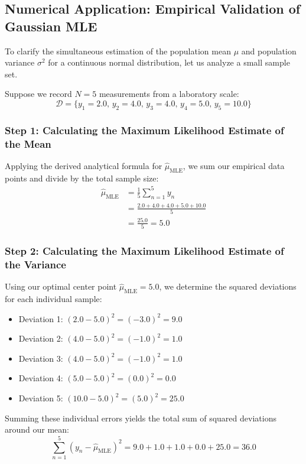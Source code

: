 \documentclass{article}
\begin{document}
\subsection{Numerical Application: Empirical Validation of Gaussian MLE}

To clarify the simultaneous estimation of the population mean $\mu$ and population variance $\sigma^2$ for a continuous normal distribution, let us analyze a small sample set. 

Suppose we record $N = 5$ measurements from a laboratory scale:
\begin{equation}
\mathcal{D} = \{y_1 = 2.0, \, y_2 = 4.0, \, y_3 = 4.0, \, y_4 = 5.0, \, y_5 = 10.0\}
\end{equation}

\subsubsection{Step 1: Calculating the Maximum Likelihood Estimate of the Mean}
Applying the derived analytical formula for $\hat{\mu}_{\text{MLE}}$, we sum our empirical data points and divide by the total sample size:
\begin{align*}
\hat{\mu}_{\text{MLE}} &= \frac{1}{5} \sum_{n=1}^{5} y_n \\
&= \frac{2.0 + 4.0 + 4.0 + 5.0 + 10.0}{5} \\
&= \frac{25.0}{5} = \mathbf{5.0}
\end{align*}

\subsubsection{Step 2: Calculating the Maximum Likelihood Estimate of the Variance}
Using our optimal center point $\hat{\mu}_{\text{MLE}} = 5.0$, we determine the squared deviations for each individual sample:
\begin{itemize}
    \item Deviation 1: $(2.0 - 5.0)^2 = (-3.0)^2 = 9.0$
    \item Deviation 2: $(4.0 - 5.0)^2 = (-1.0)^2 = 1.0$
    \item Deviation 3: $(4.0 - 5.0)^2 = (-1.0)^2 = 1.0$
    \item Deviation 4: $(5.0 - 5.0)^2 = (0.0)^2 = 0.0$
    \item Deviation 5: $(10.0 - 5.0)^2 = (5.0)^2 = 25.0$
\end{itemize}

Summing these individual errors yields the total sum of squared deviations around our mean:
\begin{equation}
\sum_{n=1}^{5} (y_n - \hat{\mu}_{\text{MLE}})^2 = 9.0 + 1.0 + 1.0 + 0.0 + 25.0 = \mathbf{36.0}
\end{equation}
\end{document}
